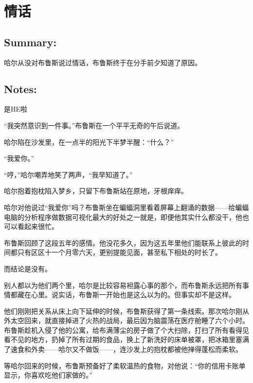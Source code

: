 \documentclass[../main.tex]{subfiles}
\begin{document}
\pagestyle{mystyle}

\chapter{情话}

\vspace{3cm}

\section*{Summary:}

哈尔从没对布鲁斯说过情话，布鲁斯终于在分手前夕知道了原因。


\vspace{3em}

\section*{Notes:}

是HE啦

\newpage

“我突然意识到一件事。”布鲁斯在一个平平无奇的午后说道。

哈尔陷在沙发里，在一点半的阳光下半梦半醒：“什么？”

“我爱你。”

“哼，”哈尔嘲弄地笑了两声，“我早知道了。”

哈尔抱着抱枕陷入梦乡，只留下布鲁斯站在原地，牙根痒痒。

哈尔对他说过“我爱你”吗？布鲁斯坐在蝙蝠洞里看着屏幕上翻涌的数据——给蝙蝠电脑的分析程序做数据可视化最大的好处之一就是，即便他其实什么都没干，他也可以看起来很忙。

布鲁斯回顾了这段五年的感情。他没花多久，因为这五年里他们能联系上彼此的时间都只有区区十一个月零六天，更别提能见面，甚至私下相处的时长了。

而结论是没有。

别人都以为他们两个里，哈尔是比较容易袒露心事的那个，而布鲁斯永远把所有事情都藏在心里。说实话，布鲁斯一开始也是这么以为的。但事实却不是这样。

他们刚刚把关系从床上向下延伸的时候，布鲁斯获得了第一条线索。那次哈尔刚从外太空回来，就直接掉进了火热的战局，最后因为脑震荡在医疗舱睡了六个小时。布鲁斯趁机入侵了他的公寓，给布满薄尘的房子做了个大扫除，打扫了所有看得见看不见的地方，扔掉了所有过期的食品，换上了新洗好的床单被罩，把冰箱里塞满了速食和外卖——哈尔又不做饭——，连沙发上的抱枕都被他掸得蓬松而柔软。

等哈尔回来的时候，布鲁斯预备好了柔软温热的食物，对他说：“你的信用卡账单显示，你喜欢吃他们家做的。”
\end{document}
